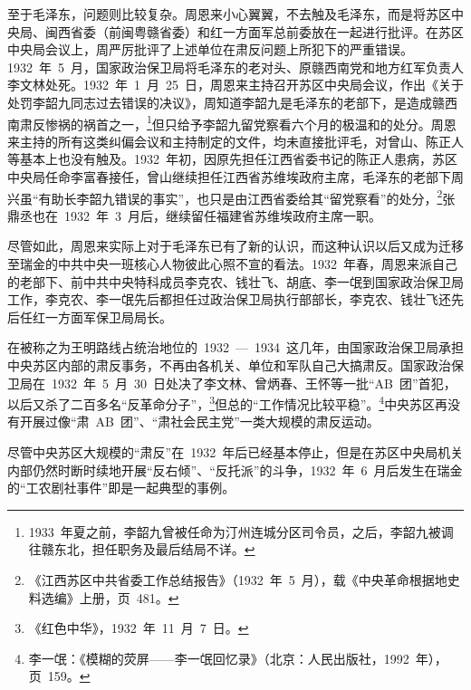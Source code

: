 至于毛泽东，问题则比较复杂。周恩来小心翼翼，不去触及毛泽东，而是将苏区中央局、闽西省委（前闽粤赣省委）和红一方面军总前委放在一起进行批评。在苏区中央局会议上，周严厉批评了上述单位在肃反问题上所犯下的严重错误。1932~年~5~月，国家政治保卫局将毛泽东的老对头、原赣西南党和地方红军负责人李文林处死。1932~年~1~月~25~日，周恩来主持召开苏区中央局会议，作出《关于处罚李韶九同志过去错误的决议》，周知道李韶九是毛泽东的老部下，是造成赣西南肃反惨祸的祸首之一，\footnote{1933~年夏之前，李韶九曾被任命为汀州连城分区司令员，之后，李韶九被调往赣东北，担任职务及最后结局不详。}但只给予李韶九留党察看六个月的极温和的处分。周恩来主持的所有这类纠偏会议和主持制定的文件，均未直接批评毛，对曾山、陈正人等基本上也没有触及。1932~年初，因原先担任江西省委书记的陈正人患病，苏区中央局任命李富春接任，曾山继续担任江西省苏维埃政府主席，毛泽东的老部下周兴虽“有助长李韶九错误的事实”，也只是由江西省委给其“留党察看”的处分，\footnote{《江西苏区中共省委工作总结报告》（1932~年~5~月），载《中央革命根据地史料选编》上册，页~481。}张鼎丞也在~1932~年~3~月后，继续留任福建省苏维埃政府主席一职。

尽管如此，周恩来实际上对于毛泽东已有了新的认识，而这种认识以后又成为迁移至瑞金的中共中央一班核心人物彼此心照不宣的看法。1932~年春，周恩来派自己的老部下、前中共中央特科成员李克农、钱壮飞、胡底、李一氓到国家政治保卫局工作，李克农、李一氓先后都担任过政治保卫局执行部部长，李克农、钱壮飞还先后任红一方面军保卫局局长。

在被称之为王明路线占统治地位的~1932~—~1934~这几年，由国家政治保卫局承担中央苏区内部的肃反事务，不再由各机关、单位和军队自己大搞肃反。国家政治保卫局在~1932~年~5~月~30~日处决了李文林、曾炳春、王怀等一批“AB~团”首犯，以后又杀了二百多名“反革命分子”，\footnote{《红色中华》，1932~年~11~月~7~日。}但总的“工作情况比较平稳”。\footnote{李一氓：《模糊的荧屏——李一氓回忆录》（北京：人民出版社，1992~年），页~159。}中央苏区再没有开展过像“肃~AB~团”、“肃社会民主党”一类大规模的肃反运动。

尽管中央苏区大规模的“肃反”在~1932~年后已经基本停止，但是在苏区中央局机关内部仍然时断时续地开展“反右倾”、“反托派”的斗争，1932~年~6~月后发生在瑞金的“工农剧社事件”即是一起典型的事例。

